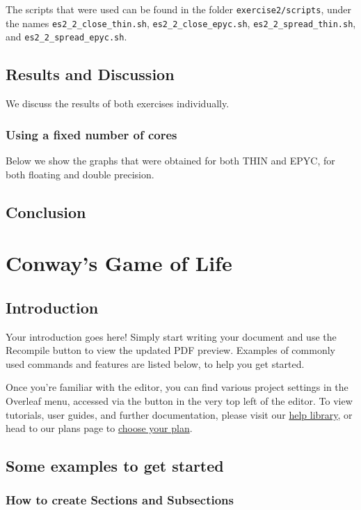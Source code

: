 \documentclass{report}
\begin{document}
The scripts that were used can be found in the folder \texttt{exercise2/scripts}, 
under the names \texttt{es2\_2\_close\_thin.sh}, \texttt{es2\_2\_close\_epyc.sh}, 
\texttt{es2\_2\_spread\_thin.sh}, and \texttt{es2\_2\_spread\_epyc.sh}.

\section{Results and Discussion}
We discuss the results of both exercises individually. 
\subsection{Using a fixed number of cores}
Below we show the graphs that were obtained for both THIN and EPYC, for both 
floating and double precision.

\section{Conclusion}

\chapter{Conway's Game of Life}


\section{Introduction}

Your introduction goes here! Simply start writing your document and use the Recompile button to view the updated PDF preview. Examples of commonly used commands and features are listed below, to help you get started.

Once you're familiar with the editor, you can find various project settings in the Overleaf menu, accessed via the button in the very top left of the editor. To view tutorials, user guides, and further documentation, please visit our \href{https://www.overleaf.com/learn}{help library}, or head to our plans page to \href{https://www.overleaf.com/user/subscription/plans}{choose your plan}.

\section{Some examples to get started}

\subsection{How to create Sections and Subsections}
\end{document}
